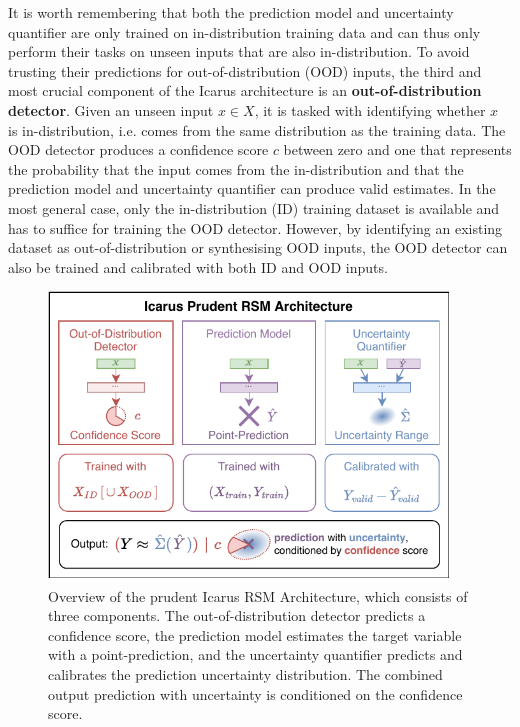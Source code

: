 It is worth remembering that both the prediction model and uncertainty quantifier are only trained on in-distribution training data and can thus only perform their tasks on unseen inputs that are also in-distribution. To avoid trusting their predictions for out-of-distribution (OOD) inputs, the third and most crucial component of the Icarus architecture is an \textbf{out-of-distribution detector}. Given an unseen input $x \in X$, it is tasked with identifying whether $x$ is in-distribution, i.e. comes from the same distribution as the training data. The OOD detector produces a confidence score $c$ between zero and one that represents the probability that the input comes from the in-distribution and that the prediction model and uncertainty quantifier can produce valid estimates. In the most general case, only the in-distribution (ID) training dataset is available and has to suffice for training the OOD detector. However, by identifying an existing dataset as out-of-distribution or synthesising OOD inputs, the OOD detector can also be trained and calibrated with both ID and OOD inputs.

\begin{figure}[H]
    \centering
    \includegraphics[width=0.95\textwidth]{icarus/figures/icarus-rsm.pdf}
    \caption[Overview of the prudent Icarus RSM Architecture]{Overview of the prudent Icarus RSM Architecture, which consists of three components. The out-of-distribution detector predicts a confidence score, the prediction model estimates the target variable with a point-prediction, and the uncertainty quantifier predicts and calibrates the prediction uncertainty distribution. The combined output prediction with uncertainty is conditioned on the confidence score.}
    \label{fig:icarus-rsm}
\end{figure}

